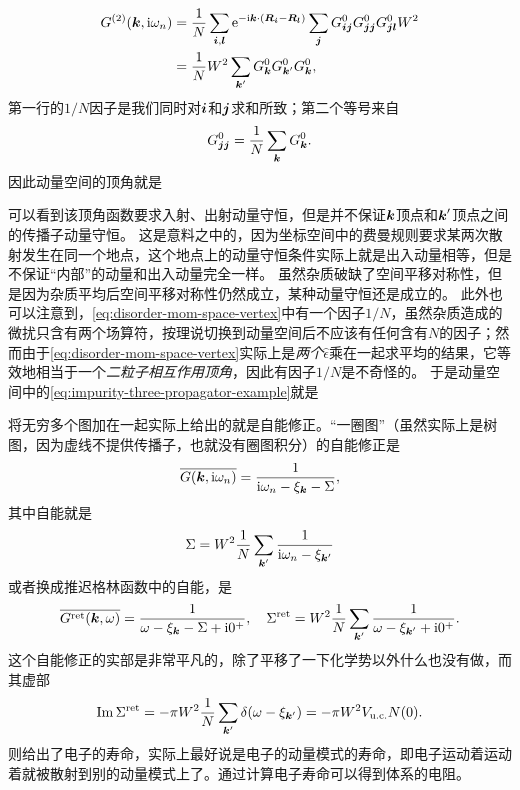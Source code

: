 \[
    \begin{aligned}
        G^{(2)}(\vb*{k}, \mathrm{i} \omega_n) &= \frac{1}{N} \sum_{\vb*{i}, \vb*{l}} \mathrm{e}^{- \mathrm{i} \vb*{k} \cdot (\vb*{R}_{\vb*{i}} - \vb*{R}_{\vb*{l}})} \sum_{\vb*{j}} G_{\vb*{i} \vb*{j}}^{0} G_{\vb*{j} \vb*{j}}^{0} G_{\vb*{j} \vb*{l}}^0 W^2 \\
        &= \frac{1}{N} W^2 \sum_{\vb*{k}'} G_{\vb*{k}}^0 G_{\vb*{k}'}^0 G_{\vb*{k}}^0,
    \end{aligned}
\]
第一行的$1/N$因子是我们同时对$\vb*{i}$和$\vb*{j}$求和所致；第二个等号来自
\[
    G_{\vb*{j} \vb*{j}}^0 = \frac{1}{N} \sum_{\vb*{k}} G^{0}_{\vb*{k}}.
\]
因此动量空间的顶角就是

可以看到该顶角函数要求入射、出射动量守恒，但是并不保证$\vb*{k}$顶点和$\vb*{k}'$顶点之间的传播子动量守恒。
这是意料之中的，因为坐标空间中的费曼规则要求某两次散射发生在同一个地点，这个地点上的动量守恒条件实际上就是出入动量相等，但是不保证“内部”的动量和出入动量完全一样。
虽然杂质破缺了空间平移对称性，但是因为杂质平均后空间平移对称性仍然成立，某种动量守恒还是成立的。
此外也可以注意到，\eqref{eq:disorder-mom-space-vertex}中有一个因子$1/N$，虽然杂质造成的微扰只含有两个场算符，按理说切换到动量空间后不应该有任何含有$N$的因子；然而由于\eqref{eq:disorder-mom-space-vertex}实际上是\emph{两个}$\hat{\epsilon}$乘在一起求平均的结果，它等效地相当于一个\emph{二粒子相互作用顶角}，因此有因子$1/N$是不奇怪的。
于是动量空间中的\eqref{eq:impurity-three-propagator-example}就是

将无穷多个图加在一起实际上给出的就是自能修正。“一圈图”（虽然实际上是树图，因为虚线不提供传播子，也就没有圈图积分）的自能修正是
\begin{equation}
    \overline{G(\vb*{k}, \mathrm{i} \omega_n)} = \frac{1}{\mathrm{i} \omega_n - \xi_{\vb*{k}} - \Sigma}  ,
\end{equation}
其中自能就是
\begin{equation}
    \Sigma = W^2 \frac{1}{N} \sum_{\vb*{k}'} \frac{1}{\mathrm{i} \omega_n - \xi_{\vb*{k}'}}
\end{equation}
或者换成推迟格林函数中的自能，是
\begin{equation}
    \overline{G^\text{ret}(\vb*{k}, \omega)} = \frac{1}{\omega - \xi_{\vb*{k}} - \Sigma + \mathrm{i} 0^+} , \quad \Sigma^\text{ret} = W^2 \frac{1}{N} \sum_{\vb*{k}'} \frac{1}{\omega - \xi_{\vb*{k}'}  + \mathrm{i} 0^+}.
\end{equation}
这个自能修正的实部是非常平凡的，除了平移了一下化学势以外什么也没有做，而其虚部
\begin{equation}
    \Im \Sigma^\text{ret} = - \pi W^2 \frac{1}{N} \sum_{\vb*{k}'} \delta(\omega - \xi_{\vb*{k}'}) = - \pi W^2 V_\text{u.c.} N(0).
\end{equation}
则给出了电子的寿命，实际上最好说是电子的动量模式的寿命，即电子运动着运动着就被散射到别的动量模式上了。通过计算电子寿命可以得到体系的电阻。


